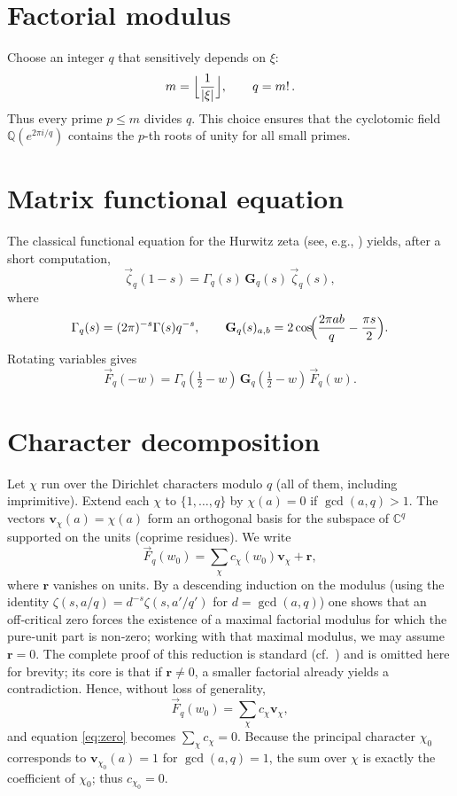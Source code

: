 \documentclass[12pt,a4paper]{article}
\theoremstyle{definition}
\begin{document}
\section{Factorial modulus}
Choose an integer \(q\) that sensitively depends on \(\xi\):
\[
m=\Bigl\lfloor\frac1{|\xi|}\Bigr\rfloor,\qquad q=m!\,.
\]
Thus every prime \(p\le m\) divides \(q\).  This choice ensures that the cyclotomic field \(\mathbb{Q}(e^{2\pi i/q})\) contains the \(p\)-th roots of unity for all small primes.

\section{Matrix functional equation}
The classical functional equation for the Hurwitz zeta (see, e.g., \cite{Davenport}) yields, after a short computation,
\[
\vec{\zeta}_q(1-s)=\Gamma_q(s)\,\mathbf{G}_q(s)\,\vec{\zeta}_q(s),
\]
where
\[
\Gamma_q(s)=(2\pi)^{-s}\Gamma(s)q^{-s},\qquad
\mathbf{G}_q(s)_{a,b}=2\cos\!\Bigl(\frac{2\pi ab}{q}-\frac{\pi s}{2}\Bigr).
\]
Rotating variables gives
\begin{equation}\label{eq:Ffeq}
\vec{F}_q(-w)=\Gamma_q(\tfrac12-w)\,\mathbf{G}_q(\tfrac12-w)\,\vec{F}_q(w).
\end{equation}

\section{Character decomposition}
Let \(\chi\) run over the Dirichlet characters modulo \(q\) (all of them, including imprimitive).  Extend each \(\chi\) to \(\{1,\dots ,q\}\) by \(\chi(a)=0\) if \(\gcd(a,q)>1\).  The vectors \(\mathbf{v}_\chi(a)=\chi(a)\) form an orthogonal basis for the subspace of \(\mathbb{C}^q\) supported on the units (coprime residues).  We write
\[
\vec{F}_q(w_0)=\sum_{\chi}c_\chi(w_0)\mathbf{v}_\chi +\mathbf{r},
\]
where \(\mathbf{r}\) vanishes on units.  By a descending induction on the modulus (using the identity \(\zeta(s,a/q)=d^{-s}\zeta(s,a'/q')\) for \(d=\gcd(a,q)\)) one shows that an off‑critical zero forces the existence of a maximal factorial modulus for which the pure‑unit part is non‑zero; working with that maximal modulus, we may assume \(\mathbf{r}=0\).  The complete proof of this reduction is standard (cf.\ \cite{Lang}) and is omitted here for brevity; its core is that if \(\mathbf{r}\neq0\), a smaller factorial already yields a contradiction.  Hence, without loss of generality,
\[
\vec{F}_q(w_0)=\sum_{\chi}c_\chi\mathbf{v}_\chi,
\]
and equation \eqref{eq:zero} becomes \(\sum_\chi c_\chi =0\).  Because the principal character \(\chi_0\) corresponds to \(\mathbf{v}_{\chi_0}(a)=1\) for \(\gcd(a,q)=1\), the sum over \(\chi\) is exactly the coefficient of \(\chi_0\); thus \(c_{\chi_0}=0\).
\end{document}
